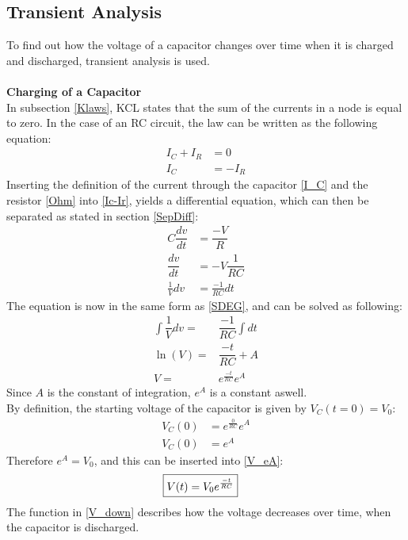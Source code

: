 \subsection{Transient Analysis}
\label{sec371}
To find out how the voltage of a capacitor changes over time when it is charged and discharged, transient analysis is used.
\\
\\
\textbf{Charging of a Capacitor}\\
In subsection \ref{Klaws}, KCL states that the sum of the currents in a node is equal to zero. In the case of an RC circuit, the law can be written as the following equation:
\begin{align}
I_{C}+I_{R}&=0 \nonumber \\
I_{C}&= -I_{R} \label{Ic-Ir}
\end{align}
Inserting the definition of the current through the capacitor \eqref{I_C} and the resistor \eqref{Ohm} into \eqref{Ic-Ir}, yields a differential equation, which can then be separated as stated in section \ref{SepDiff}:
\begin{align*}
C \dfrac{dv}{dt}&=\dfrac{-V}{R} \\
\dfrac{dv}{dt} &= -V\dfrac{1}{RC} \\
\frac{1}{V}dv &= \frac{-1}{RC}dt
\end{align*}
The equation is now in the same form as \eqref{SDEG}, and can be solved as following:
\begin{align}
\int \dfrac{1}{V}dv =& \dfrac{-1}{RC} \int dt\nonumber \\
\ln(V) =& \dfrac{-t}{RC} + A \nonumber\\
V =& e^{\frac{-t}{RC}}e^{A}\label{V_eA}
\end{align}
Since $A$ is the constant of integration, $e^A$ is a constant aswell.
\\
By definition, the starting voltage of the capacitor is given by $V_C(t=0)=V_0$:
 \begin{align*}
	V_C(0) &= e^{\frac{0}{RC}}e^A\\
	V_C(0) &= e^A
 \end{align*}
Therefore $e^A = V_0$, and this can be inserted into \eqref{V_eA}:
\begin{align}
\label{V_down}
\Aboxed{
 V(t) = V_0e^{\frac{-t}{RC}}
 }
\end{align}
The function in \eqref{V_down} describes how the voltage decreases over time, when the capacitor is discharged.
\\
\\
